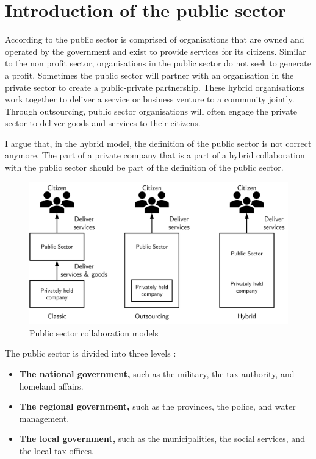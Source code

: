\section{Introduction of the public sector}
\label{sec:intropublicsector}
According to \textcite{PrivacySense2016} the public sector is comprised of organisations that are owned and operated by the government and exist to provide services for its citizens. Similar to the non profit sector, organisations in the public sector do not seek to generate a profit. Sometimes the public sector will partner with an organisation in the private sector to create a public-private partnership. These hybrid organisations work together to deliver a service or business venture to a community jointly. Through outsourcing, public sector organisations will often engage the private sector to deliver goods and services to their citizens.

I argue that, in the hybrid model, the definition of the public sector is not correct anymore. The part of a private company that is a part of a hybrid collaboration with the public sector should be part of the definition of the public sector.

\begin{figure}[H]
	\centering
	\includegraphics[width=0.7\linewidth]{images/publicsector3modelsofcolaboration}
	\caption[Public sector collaboration models]{Public sector collaboration models}
	\label{fig:publicsector3modelsofcolaboration}
\end{figure}

The public sector is divided into three levels \parencite{PrivacySense2016}:

\begin{itemize}
	\item{\textbf{The national government,} such as the military, the tax authority, and homeland affairs.}
	\item{\textbf{The regional government,} such as the provinces, the police, and water management.}
	\item{\textbf{The local government,} such as the municipalities, the social services, and the local tax offices.}
\end{itemize}

